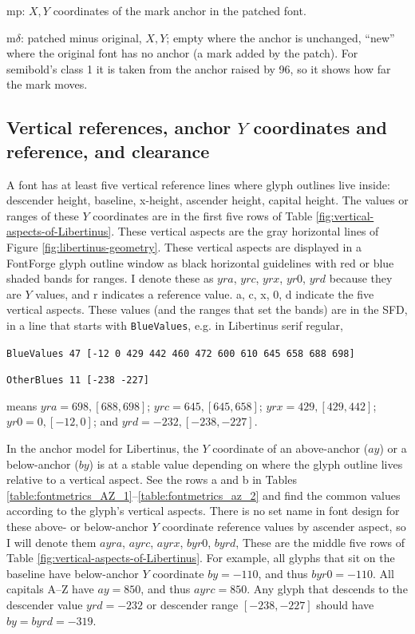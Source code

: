 \documentclass[landscape]{article}
\begin{document}
mp: $X, Y$ coordinates of the mark anchor in the patched font.

m$\delta$: patched minus original, $X, Y$; empty where the anchor is unchanged, ``new'' where the original font has no anchor (a mark added by the patch).
For semibold's class 1 it is taken from the anchor raised by 96, so it shows how far the mark moves.





%
%






\subsection*{Vertical references, anchor $Y$ coordinates and reference, and clearance}

A font has at least five vertical reference lines where glyph outlines live inside: 
descender height, baseline, x-height, ascender height, capital height.
The values or ranges of these $Y$ coordinates are in the first five rows 
of Table \ref{fig:vertical-aspects-of-Libertinus}.
These vertical aspects are the gray horizontal lines of Figure \ref{fig:libertinus-geometry}. 
These vertical aspects are displayed in a FontForge glyph outline window as black horizontal guidelines 
with red or blue shaded bands for ranges.
I denote these as $yra$, $yrc$, $yrx$, $yr0$, $yrd$ because they are $Y$ values, 
and r indicates a reference value. 
a, c, x, 0, d indicate the five vertical aspects.
These values (and the ranges that set the bands) are in the SFD, 
in a line that starts with \verb|BlueValues|, e.g. in Libertinus serif regular, 

\verb|BlueValues 47 [-12 0 429 442 460 472 600 610 645 658 688 698]|

\verb|OtherBlues 11 [-238 -227]|

means
$yra = 698, [688, 698]$; 
$yrc = 645, [645, 658]$; 
$yrx = 429, [429, 442]$; 
$yr0 = 0, [-12, 0]$; and 
$yrd = -232, [-238, -227]$.

In the anchor model for Libertinus, the $Y$ coordinate of an above-anchor ($ay$) or a below-anchor ($by$) 
is at a stable value depending on where the glyph outline lives relative to a vertical aspect.
See the rows a and b in Tables \ref{table:fontmetrics_AZ_1}--\ref{table:fontmetrics_az_2} 
and find the common values according to the glyph's vertical aspects.
There is no set name in font design for these above- or below-anchor $Y$ coordinate 
reference values by ascender aspect, so I will denote them
$ayra$, $ayrc$, $ayrx$, $byr0$, $byrd$,
These are the middle five rows of Table \ref{fig:vertical-aspects-of-Libertinus}.
For example, all glyphs that sit on the baseline have below-anchor $Y$ coordinate $by = -110$, 
and thus $byr0 = -110$.
All capitals A--Z have $ay = 850$, and thus $ayrc = 850$. 
Any glyph that descends to the descender value $yrd = -232$ or descender range $[-238, -227]$ 
should have $by = byrd = -319$.
\end{document}
